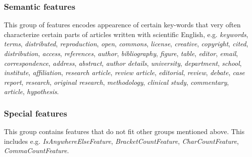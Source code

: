 \subsubsection{Semantic features}
This group of features encodes appearence of certain key-words that very often characterize certain parts of articles written with scientific English, e.g. \textit{keywords}, \textit{terms}, \textit{distributed}, \textit{reproduction}, \textit{open}, \textit{commons}, \textit{license}, \textit{creative}, \textit{copyright}, \textit{cited}, \textit{distribution}, \textit{access}, \textit{references}, \textit{author}, \textit{bibliography}, \textit{figure}, \textit{table}, \textit{editor}, \textit{email}, \textit{correspondence}, \textit{address}, \textit{abstract}, \textit{author details}, \textit{university}, \textit{department}, \textit{school}, \textit{institute}, \textit{affiliation}, \textit{research article}, \textit{review article}, \textit{editorial}, \textit{review}, \textit{debate}, \textit{case report}, \textit{research}, \textit{original research}, \textit{methodology}, \textit{clinical study}, \textit{commentary}, \textit{article}, 
 \textit{hypothesis}.

\subsubsection{Special features}
This group contains features that do not fit other groups mentioned above. This includes e.g. \textit{IsAnywhereElseFeature}, \textit{BracketCountFeature}, \textit{CharCountFeature}, \textit{CommaCountFeature}.